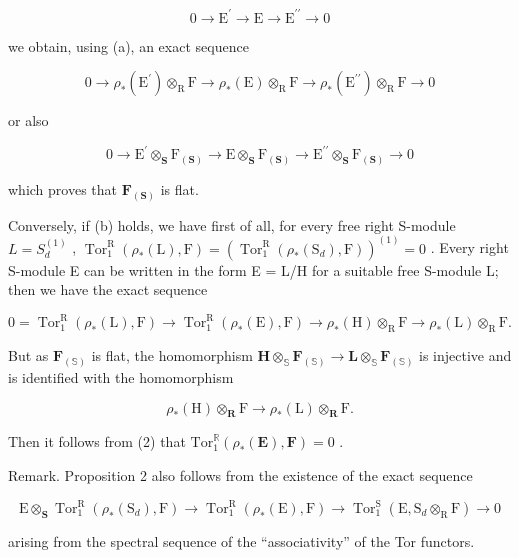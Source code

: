 \[
0 \rightarrow \mathrm{E} ^ {\prime} \rightarrow \mathrm{E} \rightarrow \mathrm{E} ^ {\prime \prime} \rightarrow 0
\]

we obtain, using (a), an exact sequence

\[
0 \rightarrow \rho_ {*} (\mathrm{E} ^ {\prime}) \otimes_ {\mathrm{R}} \mathrm{F} \rightarrow \rho_ {*} (\mathrm{E}) \otimes_ {\mathrm{R}} \mathrm{F} \rightarrow \rho_ {*} (\mathrm{E} ^ {\prime \prime}) \otimes_ {\mathrm{R}} \mathrm{F} \rightarrow 0
\]

or also

\[
0 \rightarrow \mathrm{E} ^ {\prime} \otimes_ {\mathbf {S}} \mathrm{F} _ {(\mathbf {S})} \rightarrow \mathrm{E} \otimes_ {\mathbf {S}} \mathrm{F} _ {(\mathbf {S})} \rightarrow \mathrm{E} ^ {\prime \prime} \otimes_ {\mathbf {S}} \mathrm{F} _ {(\mathbf {S})} \rightarrow 0
\]

which proves that \(\mathbf{F}_{(\mathbf{S})}\) is flat.

Conversely, if (b) holds, we have first of all, for every free right S-module \(L = S_{d}^{(1)}\) , \(\operatorname{Tor}_{1}^{\mathrm{R}}(\rho_{*}(\mathrm{L}), \mathrm{F}) = (\operatorname{Tor}_{1}^{\mathrm{R}}(\rho_{*}(\mathrm{S}_{d}), \mathrm{F}))^{(1)} = 0\) . Every right S-module E can be written in the form E = L/H for a suitable free S-module L; then we have the exact sequence

\[
0 = \operatorname{Tor} _ {1} ^ {\mathrm{R}} (\rho_ {*} (\mathrm{L}), \mathrm{F}) \rightarrow \operatorname{Tor} _ {1} ^ {\mathrm{R}} (\rho_ {*} (\mathrm{E}), \mathrm{F}) \rightarrow \rho_ {*} (\mathrm{H}) \otimes_ {\mathrm{R}} \mathrm{F} \rightarrow \rho_ {*} (\mathrm{L}) \otimes_ {\mathrm{R}} \mathrm{F}. \tag {2}
\]

But as \(\mathbf{F}_{(\mathbb{S})}\) is flat, the homomorphism \(\mathbf{H} \otimes_{\mathbb{S}} \mathbf{F}_{(\mathbb{S})} \to \mathbf{L} \otimes_{\mathbb{S}} \mathbf{F}_{(\mathbb{S})}\) is injective and is identified with the homomorphism

\[
\rho_ {*} (\mathrm{H}) \otimes_ {\mathbf {R}} \mathrm{F} \rightarrow \rho_ {*} (\mathrm{L}) \otimes_ {\mathbf {R}} \mathrm{F}.
\]

Then it follows from (2) that \(\mathrm{Tor}_1^{\mathbb{R}}(\rho_*(\mathbf{E}),\mathbf{F}) = 0\) .

Remark. Proposition 2 also follows from the existence of the exact sequence

\[
\mathrm{E} \otimes_ {\mathbf {S}} \operatorname{Tor} _ {1} ^ {\mathrm{R}} (\rho_ {*} (\mathrm{S} _ {d}), \mathrm{F}) \rightarrow \operatorname{Tor} _ {1} ^ {\mathrm{R}} (\rho_ {*} (\mathrm{E}), \mathrm{F}) \rightarrow \operatorname{Tor} _ {1} ^ {\mathrm{S}} (\mathrm{E}, \mathrm{S} _ {d} \otimes_ {\mathrm{R}} \mathrm{F}) \rightarrow 0
\]

arising from the spectral sequence of the ``associativity'' of the Tor functors.

